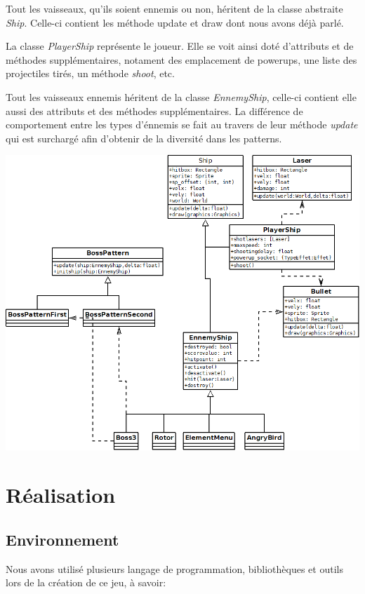 \documentclass{article}
\begin{document}
Tout les vaisseaux, qu'ils soient ennemis ou non, héritent de la classe
abstraite \emph{Ship}. Celle-ci contient les méthode update et draw dont nous
avons déjà parlé.

La classe \emph{PlayerShip} représente le joueur. Elle se voit ainsi doté
d'attributs et de méthodes supplémentaires, notament des emplacement de
powerups, une liste des projectiles tirés, un méthode \emph{shoot}, etc.

Tout les vaisseaux ennemis héritent de la classe \emph{EnnemyShip}, celle-ci
contient elle aussi des attributs et des méthodes supplémentaires. La
différence de comportement entre les types d'énnemis se fait au travers de leur
méthode \emph{update} qui est surchargé afin d'obtenir de la diversité dans les
patterns.


\begin{center}
\includegraphics[scale=0.4]{images/dia_ship.png}
\end{center}

\newpage

\section{Réalisation}
\subsection{Environnement}

Nous avons utilisé plusieurs langage de programmation, bibliothèques et outils
lors de la création de ce jeu, à savoir: \newline
\end{document}
